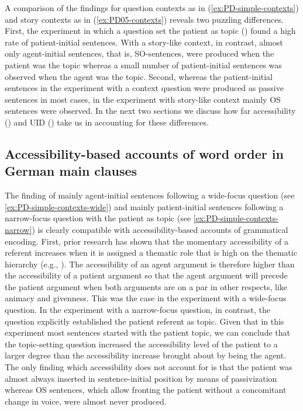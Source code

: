 \documentclass[output=paper,colorlinks,citecolor=brown]{langscibook}
\begin{document}
A comparison of the findings for question contexts as in (\ref{ex:PD-simple-contexts}) and story contexts as in (\ref{ex:PD05-contexts}) reveals two puzzling differences. First, the experiment in which a question set the patient as topic () found a high rate of patient-initial sentences. With a story-like context, in contrast, almost only agent-initial sentences, that is, SO-sentences, were produced when the patient was the topic whereas a small number of patient-initial sentences was observed when the agent was the topic. Second, whereas the patient-initial sentences in the experiment with a context question were produced as passive sentences in most cases, in the experiment with story-like context mainly OS sentences were observed. In the next two sections we discuss how far accessibility () and  UID () take us in accounting for these differences.


\subsection{Accessibility-based accounts of word order in German main clauses\label{section-word-order-accessibility}}

The finding of mainly agent-initial sentences following a wide-focus question (see \ref{ex:PD-simple-contexts-wide}) and mainly patient-initial sentences following a narrow-focus question with the patient as topic (see \ref{ex:PD-simple-contexts-narrow}) is clearly compatible with accessibility-based accounts of grammatical encoding. First, prior research has shown that the momentary accessibility of a referent increases when it is assigned a thematic role that is high on the thematic hierarchy (e.g., \citealt{Ferreira-94}). The accessibility of an agent argument is therefore higher than the accessibility of a patient argument so that the agent argument will precede the patient argument when both arguments are on a par in other respects, like animacy and givenness. This was the case in the experiment with a wide-focus question. In the experiment with a narrow-focus question, in contrast, the question explicitly established the patient referent as topic. Given that in this experiment most sentences started with the patient topic, we can conclude that the topic-setting question increased the accessibility level of the patient to a larger degree than the accessibility increase brought about by being the agent. The only finding which accessibility does not account for is that the patient was almost always inserted in sentence-initial position by means of passivization whereas OS sentences, which allow fronting the patient without a concomitant change in voice, were almost never produced. 
\end{document}

